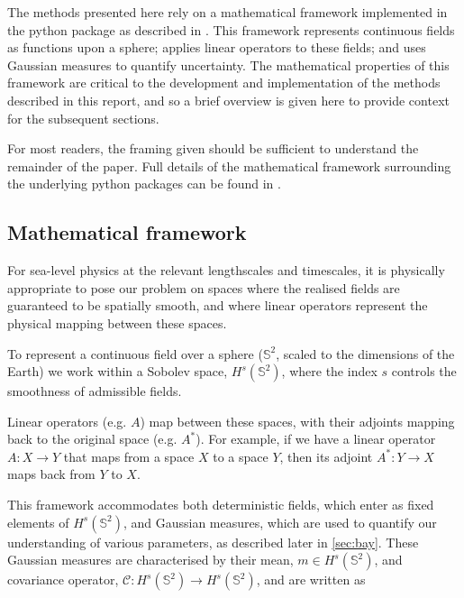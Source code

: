 The methods presented here rely on a mathematical framework implemented in the  python package as described in \textcite{heathcoteScaleableBayesianFramework2026}. This framework represents continuous fields as functions upon a sphere; applies linear operators to these fields; and uses Gaussian measures to quantify uncertainty. The mathematical properties of this framework are critical to the development and implementation of the methods described in this report, and so a brief overview is given here to provide context for the subsequent sections.

For most readers, the framing given should be sufficient to understand the remainder of the paper. Full details of the mathematical framework surrounding the underlying python packages can be found in \textcite{heathcoteScaleableBayesianFramework2026}.

\subsection{Mathematical framework}\label{sec:maths_background}

For sea-level physics at the relevant lengthscales and timescales, it is physically appropriate to pose our problem on spaces where the realised fields are guaranteed to be spatially smooth, and where linear operators represent the physical mapping between these spaces.

To represent a continuous field over a sphere ($\mathbb{S}^2$, scaled to the dimensions of the Earth) we work within a Sobolev space, $H^s\left(\mathbb{S}^2\right)$, where the index $s$ controls the smoothness of admissible fields.

Linear operators (e.g. $A$) map between these spaces, with their adjoints mapping back to the original space (e.g. $A^*$). For example, if we have a linear operator $A: X \to Y$ that maps from a space $X$ to a space $Y$, then its adjoint $A^*: Y \to X$ maps back from $Y$ to $X$.

This framework accommodates both deterministic fields, which enter as fixed elements of $H^s\left(\mathbb{S}^2\right)$, and Gaussian measures, which are used to quantify our understanding of various parameters, as described later in \autoref{sec:bay}. These Gaussian measures are characterised by their mean, $m \in H^s\left(\mathbb{S}^2\right)$, and covariance operator, $\mathcal{C}: H^s\left(\mathbb{S}^2\right) \to H^s\left(\mathbb{S}^2\right)$, and are written as

